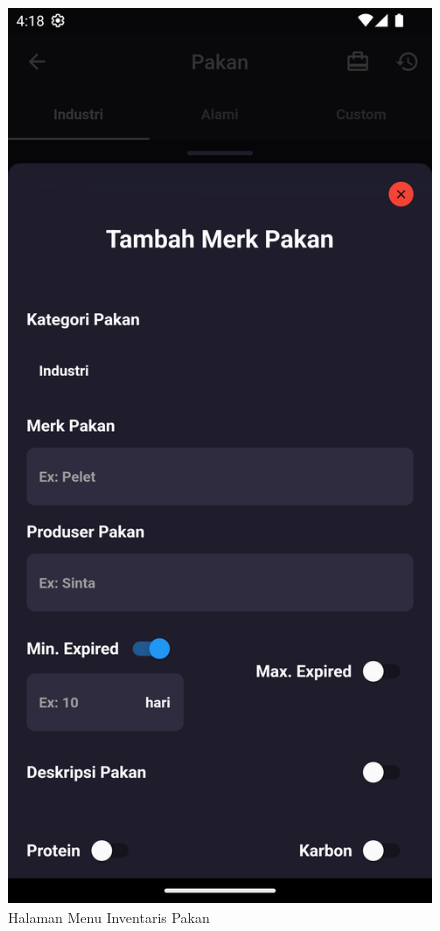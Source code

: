 \begin{spacing}{1.5}
\begin{enumerate}
\begin{itemize}
\begin{figure}[H]
					\caption{Halaman Menu Inventaris Pakan}
				\endminipage\hfill
					\includegraphics[width=\linewidth]{gambar/sprint4/input_name_pakan.png}

\end{figure}
\end{itemize}
\end{enumerate}
\end{spacing}

